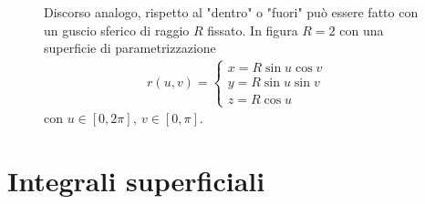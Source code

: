 \begin{example}
\begin{figure}[H]
\begin{minipage}{0.4\textwidth}
    Discorso analogo, rispetto al "dentro" o "fuori" può essere fatto con un guscio sferico di raggio $R$ fissato. In figura $R=2$ con una superficie di parametrizzazione
    \begin{align*}
    r(u,v)=\begin{cases}
        x= R \sin u \cos v\\
        y= R \sin u \sin v\\
        z= R \cos u
    \end{cases}    
    \end{align*}
    con $u \in [0, 2\pi],\ v \in [0, \pi]$.
    \end{minipage}
    \end{figure}
 \end{example}
\section{Integrali superficiali}
